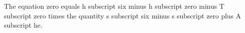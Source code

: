 The equation zero equals h subscript six minus h subscript zero minus T subscript zero times the quantity s subscript six minus s subscript zero plus A subscript he.